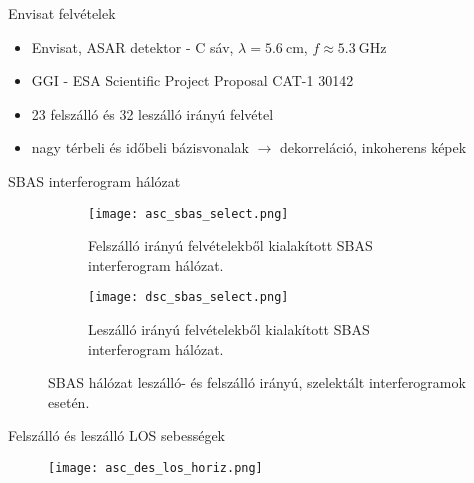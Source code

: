 \documentclass[14pt, aspectratio=169]{beamer}
\begin{document}
\begin{frame}{Envisat felvételek}
    \begin{itemize}
        \item Envisat, ASAR detektor - C sáv, $\lambda = \SI{5.6}{\centi\meter}$, $f \approx \SI{5.3}{\giga\hertz}$
        \item GGI - ESA Scientific Project Proposal CAT-1 30142
        \item 23 felszálló és 32 leszálló irányú felvétel
        \item nagy térbeli és időbeli bázisvonalak $\rightarrow$ dekorreláció, inkoherens képek
    \end{itemize}

\end{frame}


\begin{frame}{SBAS interferogram hálózat}
    \begin{center}
        \begin{figure}
            \begin{subfigure}[t]{.49\linewidth}
                \centering
                \texttt{[image: asc\_sbas\_select.png]}
                \caption{Felszálló irányú felvételekből kialakított SBAS interferogram hálózat.}
            \end{subfigure}
            \begin{subfigure}[t]{.49\linewidth}
                \centering
                \texttt{[image: dsc\_sbas\_select.png]}
                \caption{Leszálló irányú felvételekből kialakított SBAS interferogram hálózat.}
            \end{subfigure}
        \caption{SBAS hálózat leszálló- és felszálló irányú, szelektált interferogramok esetén.}
        \end{figure}
    \end{center}
\end{frame}


\begin{frame}{Felszálló és leszálló LOS sebességek}
    \begin{figure}
        \centering
        \texttt{[image: asc\_des\_los\_horiz.png]}
    \end{figure}
\end{frame}
\end{document}
